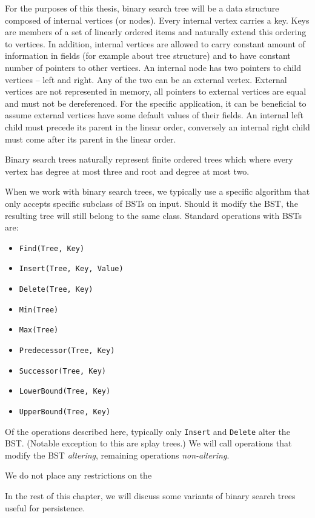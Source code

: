 For the purposes of this thesis, binary search tree will be a data structure composed of internal vertices (or nodes). Every internal vertex carries a key. Keys are members of a set of linearly ordered items and naturally extend this ordering to vertices. In addition, internal vertices are allowed to carry constant amount of information in fields (for example about tree structure) and to have constant number of pointers to other vertices. An internal node has two pointers to child vertices -- left and right. Any of the two can be an external vertex. External vertices are not represented in memory, all pointers to external vertices are equal and must not be dereferenced. For the specific application, it can be beneficial to assume external vertices have some default values of their fields. An internal left child must precede its parent in the linear order, conversely an internal right child must come after its parent in the linear order.

Binary search trees naturally represent finite ordered trees which where every vertex has degree at most three and root and degree at most two.

When we work with binary search trees, we typically use a specific algorithm that only accepts specific subclass of BSTs on input. Should it modify the BST, the resulting tree will still belong to the same class. Standard operations with BSTs are:

\begin{itemize}
	\item \texttt{Find(Tree, Key)}
	\item \texttt{Insert(Tree, Key, Value)}
	\item \texttt{Delete(Tree, Key)}
	\item \texttt{Min(Tree)}
	\item \texttt{Max(Tree)}
	\item \texttt{Predecessor(Tree, Key)}
	\item \texttt{Successor(Tree, Key)}
	\item \texttt{LowerBound(Tree, Key)}
	\item \texttt{UpperBound(Tree, Key)}
\end{itemize}

Of the operations described here, typically only \texttt{Insert} and \texttt{Delete} alter the BST. (Notable exception to this are splay trees.) We will call operations that modify the BST {\em altering}, remaining operations {\em non-altering}.

We do not place any restrictions on the 

In the rest of this chapter, we will discuss some variants of binary search trees useful for persistence.